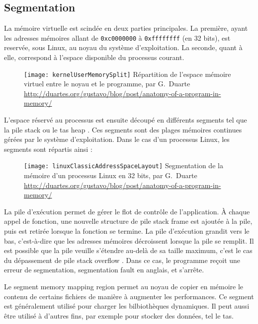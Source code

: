 \subsection{Segmentation}

La mémoire virtuelle est scindée en deux parties principales. La première, ayant les adresses mémoires allant de \texttt{0xc0000000} à \texttt{0xffffffff} (en 32 bits), est reservée, sous Linux, au noyau du système d'exploitation. La seconde, quant à elle, correspond à l'espace disponible du processus courant.

\begin{figure}[H]
	\centering
	\texttt{[image: kernelUserMemorySplit]}
	{Répartition de l'espace mémoire virtuel entre le noyau et le programme, par G.~Duarte}
	{\url{http://duartes.org/gustavo/blog/post/anatomy-of-a-program-in-memory/}}
	\label{fig:kernelUserMemorySplit}
\end{figure}

L'espace réservé au processus est ensuite découpé en différents segments tel que la pile \og stack \fg ou le tas \og heap \fg. Ces segments sont des plages mémoires continues gérées par le système d'exploitation. Dans le cas d'un processus Linux, les segments sont répartis ainsi :

\begin{figure}[H]
	\centering
	\texttt{[image: linuxClassicAddressSpaceLayout]}
	{Segmentation de la mémoire d'un processus Linux en 32 bits, par G.~Duarte}
	{\url{http://duartes.org/gustavo/blog/post/anatomy-of-a-program-in-memory/}}
	\label{fig:linuxClassicAddressSpaceLayout}
\end{figure}

\vfill

La pile d'exécution permet de gérer le flot de contrôle de l'application. À chaque appel de fonction, une nouvelle structure de pile \og stack frame \fg est ajoutée à la pile, puis est retirée lorsque la fonction se termine. La pile d'exécution grandit vers le bas, c'est-à-dire que les adresses mémoires décroissent lorsque la pile se remplit. Il est possible que la pile veuille s'étendre au-delà de sa taille maximum, c'est le cas du dépassement de pile \og stack overflow \fg. Dans ce cas, le programme reçoit une erreur de segmentation, \og segmentation fault \fg en anglais, et s'arrête.

Le segment \og memory mapping region \fg permet au noyau de copier en mémoire le contenu de certains fichiers de manière à augmenter les performances. Ce segment est généralement utilisé pour charger les bilbiothèques dynamiques. Il peut aussi être utilisé à d'autres fins, par exemple pour stocker des données, tel le tas.

